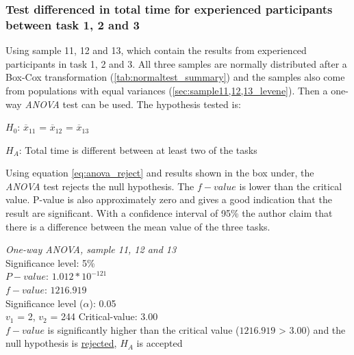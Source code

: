 \vspace{0.5cm}

\subsubsection[Sample 11, 12 and 13]{Test differenced in total time for experienced participants between task 1, 2 and 3}\label{sec:sample_11_12_13_anova}

Using sample 11, 12 and 13, which contain the results from experienced participants in task 1, 2 and 3. All three samples are normally distributed after a Box-Cox transformation (\ref{tab:normaltest_summary}) and the samples also come from populations with equal variances (\ref{sec:sample11,12,13_levene}). Then a one-way \textit{ANOVA} test can be used. The hypothesis tested is: 

\centerline{$H_{0}$: $\overline{x}_11$ = $\overline{x}_12$ = $\overline{x}_13$}
\centerline{$H_{A}$: Total time is different between at least two of the tasks}

Using equation \ref{eq:anova_reject} and results shown in the box under, the \textit{ANOVA} test rejects the null hypothesis. The $f-value$ is lower than the critical value. P-value is also approximately zero and gives a good indication that the result are significant. With a confidence interval of 95\% the author claim that there is a difference between the mean value of the three tasks.

\begin{center}
	\begin{tcolorbox}[box align=center,width=\textwidth-5cm]
		\centering
		\textit{One-way \textit{ANOVA}, sample 11, 12 and 13}\\
		Significance level: 5\%  \\[0.5cm]
		
		$P-value$: $1.012 * 10^{-121}$ \\
		$f-value$: $1216.919$ \\
		Significance level ($\alpha$): 0.05 \\
		$v_1$ = 2, $v_2$ = 244 %
		Critical-value: 3.00 \\[0.2cm] %
		
		$f-value$ is significantly higher than the critical value ($1216.919$ > $3.00$) and the null hypothesis is \underline{rejected}, $H_A$ is accepted\\[0.5cm]
	\end{tcolorbox} 
\end{center}

